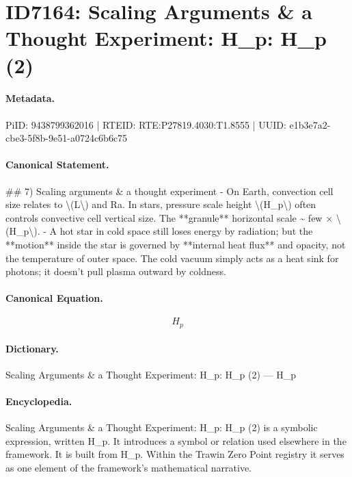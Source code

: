 \section*{ID7164: Scaling Arguments \& a Thought Experiment: H\_p: H\_p (2)}
\paragraph{Metadata.}
PiID: 9438799362016 | RTEID: RTE:P27819.4030:T1.8555 | UUID: e1b3e7a2-cbe3-5f8b-9e51-a0724c6b6c75

\paragraph{Canonical Statement.}
\#\# 7) Scaling arguments \& a thought experiment - On Earth, convection cell size relates to \textbackslash{}(L\textbackslash{}) and Ra. In stars, pressure scale height \textbackslash{}(H\_p\textbackslash{}) often controls convective cell vertical size. The **granule** horizontal scale \textasciitilde{} few × \textbackslash{}(H\_p\textbackslash{}). - A hot star in cold space still loses energy by radiation; but the **motion** inside the star is governed by **internal heat flux** and opacity, not the temperature of outer space. The cold vacuum simply acts as a heat sink for photons; it doesn’t pull plasma outward by coldness.

\paragraph{Canonical Equation.}
\[
H_p
\]

\paragraph{Dictionary.}
Scaling Arguments \& a Thought Experiment: H\_p: H\_p (2) — H\_p

\paragraph{Encyclopedia.}
Scaling Arguments \& a Thought Experiment: H\_p: H\_p (2) is a symbolic expression, written H\_p. It introduces a symbol or relation used elsewhere in the framework. It is built from H\_p. Within the Trawin Zero Point registry it serves as one element of the framework's mathematical narrative.
